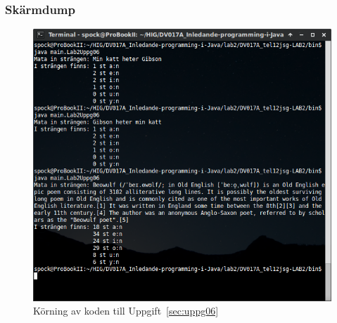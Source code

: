 \subsubsection{Skärmdump}
\begin{figure}[htbp]
    \centering
        \includegraphics[width=\linewidth]{img/06.png}
    \caption{Körning av koden till Uppgift~\ref{sec:uppg06}}
    \label{fig:uppg06-screenshot}
\end{figure}

